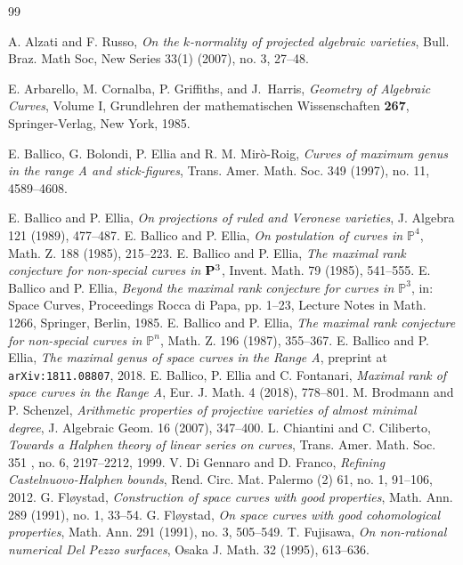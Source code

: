 \documentclass[a4, 11pt]{amsart}
\theoremstyle{plain}
\theoremstyle{definition}
\newcommand{\enm}[1]{\ensuremath{#1}}          %
\newcommand{\PP}{\enm{\mathbb{P}}}
\begin{document}
\begin{small}
\begin{thebibliography}{99}

 A. Alzati and F. Russo, {\it On the $k$-normality of projected algebraic varieties}, Bull. Braz. Math Soc, New Series 33(1) (2007), no. 3,  27--48. 

 E. Arbarello, M. Cornalba, P. Griffiths, and J.~Harris, {\it Geometry of Algebraic Curves}, Volume I, Grundlehren der mathematischen Wissenschaften {\bf 267}, Springer-Verlag, New York, 1985.

 E. Ballico, G. Bolondi, P. Ellia and R. M. Mir\`{o}-Roig, {\it Curves of maximum genus in the range A and stick-figures},
Trans. Amer. Math. Soc. 349 (1997), no. 11, 4589--4608.

 E. Ballico and P. Ellia, {\it On projections of ruled and Veronese varieties}, J. Algebra 121 (1989), 477--487. 
 E. Ballico and P. Ellia, {\it On postulation of curves in $\mathbb {P}^4$}, Math. Z. 188 (1985), 215--223.
 E. Ballico and P. Ellia, {\it The maximal rank conjecture for non-special curves in ${\bf {P}}^3$}, Invent. Math.
79 (1985), 541--555.
 E. Ballico and P. Ellia, {\it Beyond the maximal rank conjecture for curves in $\mathbb {P}^3$}, in: Space Curves,
Proceedings Rocca di Papa, pp. 1--23, Lecture Notes in Math. 1266, Springer, Berlin, 1985.
 E. Ballico and P. Ellia, {\it The maximal rank conjecture for non-special curves in $\PP^n$}, Math. Z. 196 (1987),
355--367.
 E. Ballico and P. Ellia, {\it The maximal genus of space curves in the Range A}, preprint at \texttt{arXiv:1811.08807}, 2018. 
 E. Ballico, P. Ellia and C. Fontanari, {\it Maximal rank of space curves in the Range A}, Eur. J. Math. 4 (2018),
778--801.
 M. Brodmann and P. Schenzel, {\it Arithmetic properties of projective varieties of almost minimal degree}, J. Algebraic Geom. 16 (2007), 347--400.
 L. Chiantini and C. Ciliberto, {\it Towards a Halphen theory of linear series on curves}, Trans. Amer. Math. Soc. 351 , no. 6, 2197--2212, 1999. 
 V. Di Gennaro and D. Franco, {\it Refining Castelnuovo-Halphen bounds}, Rend. Circ. Mat. Palermo (2) 61, no. 1, 91--106, 2012. 
 G. Fl{\o}ystad, {\it Construction of space curves with good properties}, Math. Ann. 289 (1991), no. 1, 33--54.
 G. Fl{\o}ystad, {\it On space curves with good cohomological properties}, Math. Ann. 291 (1991), no. 3, 505--549.
 T. Fujisawa, {\it On non-rational numerical Del Pezzo surfaces}, Osaka J. Math. 32 (1995), 613--636.

\end{thebibliography}
\end{small}
\end{document}
